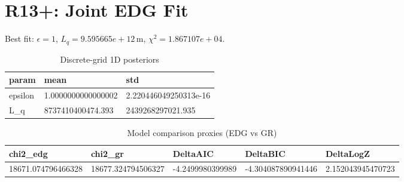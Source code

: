 \section{R13+: Joint EDG Fit}
Best fit: $\epsilon = 1$, $L_q = 9.595665e+12\,\mathrm{m}$, $\chi^2 = 1.867107e+04$.
\begin{table}[h!]
\centering
\caption{Discrete-grid 1D posteriors}
\label{tab:r13p_marg}
\begin{tabular}{l | l | l}
\hline
param & mean & std \\
\hline
epsilon & 1.0000000000000002 & 2.220446049250313e-16 \\
L_q & 8737410400474.393 & 2439268297021.935 \\
\hline
\end{tabular}
\end{table}

\begin{table}[h!]
\centering
\caption{Model comparison proxies (EDG vs GR)}
\label{tab:r13p_model}
\begin{tabular}{l | l | l | l | l}
\hline
chi2_edg & chi2_gr & DeltaAIC & DeltaBIC & DeltaLogZ \\
\hline
18671.074796466328 & 18677.324794506327 & -4.2499980399989 & -4.304087890941446 & 2.152043945470723 \\
\hline
\end{tabular}
\end{table}

